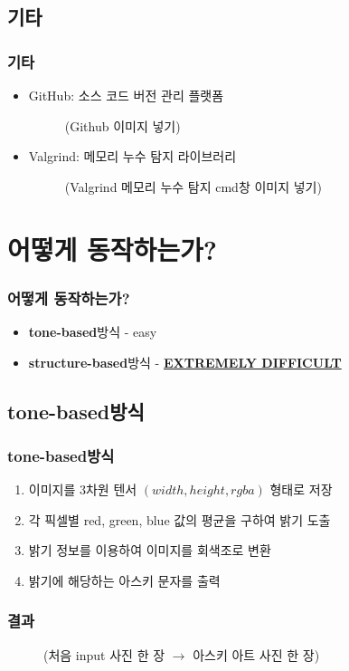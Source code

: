 \documentclass{beamer}
\newcommand{\spacing}{\hspace{0.3em}}
\newcommand{\tonebased}{\textbf{tone-based}}
\newcommand{\structurebased}{\textbf{structure-based}}
\begin{document}
	\subsection{기타}
	\begin{frame}{}
		\frametitle{기타}
		\begin{itemize}
			\item GitHub: 소스 코드 버전 관리 플랫폼
			\begin{figure}
				(Github 이미지 넣기)
			\end{figure}
			\item Valgrind: 메모리 누수 탐지 라이브러리
			\begin{figure}
				(Valgrind 메모리 누수 탐지 cmd창 이미지 넣기)
			\end{figure}
		\end{itemize}
	\end{frame}

\section{어떻게 동작하는가?}
\begin{frame}{}
	\frametitle{어떻게 동작하는가?}
	\begin{itemize}
		\item \tonebased \spacing 방식 - easy
		\item \structurebased \spacing 방식 - \underline{\textbf{EXTREMELY DIFFICULT}}
	\end{itemize}
\end{frame}

	\subsection{\tonebased \spacing 방식}
	\begin{frame}{}
		\frametitle{\tonebased \spacing 방식}
		\begin{enumerate}
			\item 이미지를 3차원 텐서 $ ( width, height, rgba ) $ 형태로 저장
			\item 각 픽셀별 red, green, blue 값의 평균을 구하여 밝기 도출
			\item 밝기 정보를 이용하여 이미지를 회색조로 변환
			\item 밝기에 해당하는 아스키 문자를 출력
		\end{enumerate}
	\end{frame}
	\begin{frame}
		\frametitle{결과}
		\begin{figure}
			\centering
			(처음 input 사진 한 장 $ \rightarrow $ 아스키 아트 사진 한 장)
		\end{figure}
	\end{frame}
\end{document}
